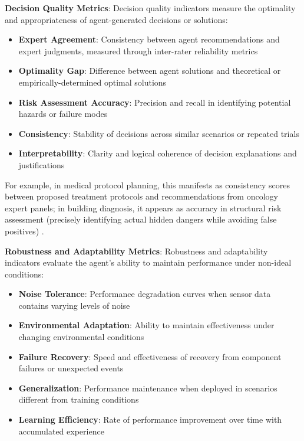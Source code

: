 \textbf{Decision Quality Metrics}: Decision quality indicators measure the optimality and appropriateness of agent-generated decisions or solutions:

\begin{itemize}
\item \textbf{Expert Agreement}: Consistency between agent recommendations and expert judgments, measured through inter-rater reliability metrics
\item \textbf{Optimality Gap}: Difference between agent solutions and theoretical or empirically-determined optimal solutions
\item \textbf{Risk Assessment Accuracy}: Precision and recall in identifying potential hazards or failure modes
\item \textbf{Consistency}: Stability of decisions across similar scenarios or repeated trials
\item \textbf{Interpretability}: Clarity and logical coherence of decision explanations and justifications
\end{itemize}

For example, in medical protocol planning, this manifests as consistency scores between proposed treatment protocols and recommendations from oncology expert panels; in building diagnosis, it appears as accuracy in structural risk assessment (precisely identifying actual hidden dangers while avoiding false positives) \cite{rasheed2020digital}.

\textbf{Robustness and Adaptability Metrics}: Robustness and adaptability indicators evaluate the agent's ability to maintain performance under non-ideal conditions:

\begin{itemize}
\item \textbf{Noise Tolerance}: Performance degradation curves when sensor data contains varying levels of noise
\item \textbf{Environmental Adaptation}: Ability to maintain effectiveness under changing environmental conditions
\item \textbf{Failure Recovery}: Speed and effectiveness of recovery from component failures or unexpected events
\item \textbf{Generalization}: Performance maintenance when deployed in scenarios different from training conditions
\item \textbf{Learning Efficiency}: Rate of performance improvement over time with accumulated experience
\end{itemize}

